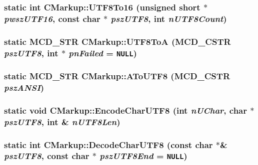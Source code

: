 \subsubsection[UTF8To16]{\setlength{\rightskip}{0pt plus 5cm}static int CMarkup::UTF8To16 (unsigned short $\ast$ {\em pwszUTF16}, \/  const char $\ast$ {\em pszUTF8}, \/  int {\em nUTF8Count})\hspace{0.3cm}{\tt  [static]}}\label{classCMarkup_c5196f0e363a619fad8dbf5c0ea55d31}


\subsubsection[UTF8ToA]{\setlength{\rightskip}{0pt plus 5cm}static MCD\_\-STR CMarkup::UTF8ToA ({\bf MCD\_\-CSTR} {\em pszUTF8}, \/  int $\ast$ {\em pnFailed} = {\tt NULL})\hspace{0.3cm}{\tt  [static]}}\label{classCMarkup_8e6cb088e69b6078f5923b0940fd647c}


\subsubsection[AToUTF8]{\setlength{\rightskip}{0pt plus 5cm}static MCD\_\-STR CMarkup::AToUTF8 ({\bf MCD\_\-CSTR} {\em pszANSI})\hspace{0.3cm}{\tt  [static]}}\label{classCMarkup_3257cd5f249587254e816d12bd3b0e0d}


\subsubsection[EncodeCharUTF8]{\setlength{\rightskip}{0pt plus 5cm}static void CMarkup::EncodeCharUTF8 (int {\em nUChar}, \/  char $\ast$ {\em pszUTF8}, \/  int \& {\em nUTF8Len})\hspace{0.3cm}{\tt  [static]}}\label{classCMarkup_10ff4693c95b049ad13b9537858aabfd}


\subsubsection[DecodeCharUTF8]{\setlength{\rightskip}{0pt plus 5cm}static int CMarkup::DecodeCharUTF8 (const char $\ast$\& {\em pszUTF8}, \/  const char $\ast$ {\em pszUTF8End} = {\tt NULL})\hspace{0.3cm}{\tt  [static]}}\label{classCMarkup_637a7f8239f974d4ce5fe2e33336ca9e}


